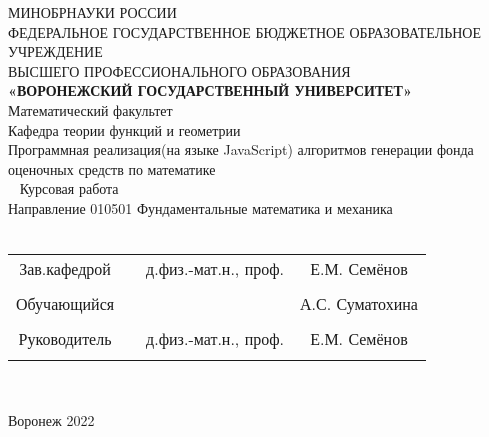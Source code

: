 
\begin{center}
    \hfill \break
    \large{МИНОБРНАУКИ РОССИИ}\\
    \footnotesize{ФЕДЕРАЛЬНОЕ ГОСУДАРСТВЕННОЕ БЮДЖЕТНОЕ ОБРАЗОВАТЕЛЬНОЕ УЧРЕЖДЕНИЕ}\\ 
    \footnotesize{ВЫСШЕГО ПРОФЕССИОНАЛЬНОГО ОБРАЗОВАНИЯ}\\
    \small{\textbf{«ВОРОНЕЖСКИЙ ГОСУДАРСТВЕННЫЙ УНИВЕРСИТЕТ»}}\\
    \hfill \break
    \normalsize{Математический факультет}\\
     \hfill \break
    \normalsize{Кафедра теории функций и геометрии}\\
    \hfill\break
    \hfill \break
    \hfill \break
    \hfill \break
    \large{Программная реализация(на языке JavaScript) алгоритмов генерации фонда оценочных средств по математике}\\
    \hfill \break
    \hfill \break
    \hfill \break\
    \hfill \break
    \hfill \break
    \normalsize{Курсовая работа\\
    \hfill \break
    Направление  010501 Фундаментальные математика и механика\\

    \hfill \break
    }\\
    \hfill \break
    \hfill \break
    \end{center}
    \hfill \break
     
    \normalsize{ 
    \begin{tabular}{cccc}
    Зав.кафедрой & \underline{\hspace{3cm}} &  д.физ.-мат.н.,  проф. & Е.М. Семёнов \\\\
    Обучающийся & \underline{\hspace{3cm}} & &А.С. Суматохина \\\\
    Руководитель & \underline{\hspace{3cm}}&  д.физ.-мат.н.,  проф. & Е.М. Семёнов \\\\
    \end{tabular}
    }\\
    \hfill \break
    \hfill \break
    \begin{center} Воронеж 2022 \end{center}
    \thispagestyle{empty} %
     
     